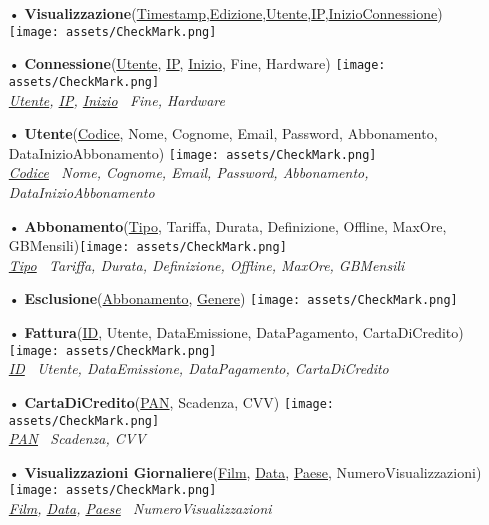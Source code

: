 \documentclass{article}
\begin{document}
\begin{itemize}
    \item[•] \textbf{Visualizzazione}(\underline{Timestamp},\underline{Edizione},\underline{Utente},\underline{IP},\underline{InizioConnessione}) \texttt{[image: assets/CheckMark.png]}

    \item[•] \textbf{Connessione}(\underline{Utente}, \underline{IP}, \underline{Inizio}, Fine, Hardware) \texttt{[image: assets/CheckMark.png]} \\
    {\small \textit{\underline{Utente}, \underline{IP}, \underline{Inizio} \textrightarrow\, Fine, Hardware}} %

    \item[•] \textbf{Utente}(\underline{Codice}, Nome, Cognome, Email, Password, Abbonamento, DataInizioAbbonamento) \texttt{[image: assets/CheckMark.png]} \\
    {\small \textit{\underline{Codice} \textrightarrow\, Nome, Cognome, Email, Password, Abbonamento, DataInizioAbbonamento}}

    \item[•] \textbf{Abbonamento}(\underline{Tipo}, Tariffa, Durata, Definizione, Offline, MaxOre, GBMensili)\texttt{[image: assets/CheckMark.png]} \\
    {\small \textit{\underline{Tipo} \textrightarrow\, Tariffa, Durata, Definizione, Offline, MaxOre, GBMensili}}

    \item[•] \textbf{Esclusione}(\underline{Abbonamento}, \underline{Genere}) \texttt{[image: assets/CheckMark.png]} 

    \item[•] \textbf{Fattura}(\underline{ID}, Utente, DataEmissione, DataPagamento, CartaDiCredito) \texttt{[image: assets/CheckMark.png]} \\
    {\small \textit{\underline{ID} \textrightarrow\, Utente, DataEmissione, DataPagamento, CartaDiCredito}}

    \item[•] \textbf{CartaDiCredito}(\underline{PAN}, Scadenza, CVV) \texttt{[image: assets/CheckMark.png]} \\
    {\small \textit{\underline{PAN} \textrightarrow\, Scadenza, CVV}}

    \item[•] \textbf{Visualizzazioni Giornaliere}(\underline{Film}, \underline{Data}, \underline{Paese}, NumeroVisualizzazioni) \texttt{[image: assets/CheckMark.png]} \\
    {\small \textit{\underline{Film}, \underline{Data}, \underline{Paese} \textrightarrow\, NumeroVisualizzazioni}}
    
\end{itemize}
\end{document}
